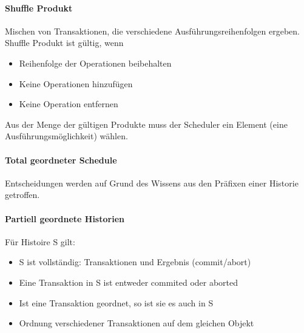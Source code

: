 \documentclass[ngerman]{scrartcl}
\begin{document}
\paragraph*{Shuffle Produkt} Mischen von Transaktionen, die verschiedene Ausführungsreihenfolgen ergeben. Shuffle Produkt ist gültig, wenn 
\begin{itemize}
  \item Reihenfolge der Operationen beibehalten
  \item Keine Operationen hinzufügen
  \item Keine Operation entfernen
\end{itemize} 
Aus der Menge der gültigen Produkte muss der Scheduler ein Element (eine Ausführungsmöglichkeit) wählen.

\paragraph*{Total geordneter Schedule}
Entscheidungen werden auf Grund des Wissens aus den Präfixen einer Historie getroffen.

\paragraph*{Partiell geordnete Historien}
Für Histoire S gilt:
\begin{itemize}
  \item S ist vollständig: Transaktionen und Ergebnis (commit/abort)
  \item Eine Transaktion in S ist entweder commited oder aborted
  \item Ist eine Transaktion geordnet, so ist sie es auch in S
  \item Ordnung verschiedener Transaktionen auf dem gleichen Objekt
\end{itemize}
\end{document}
